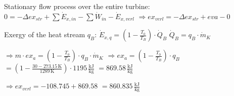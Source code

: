 Stationary flow process over the entire turbine:  
\( 0 = -\Delta ex_{str} + \sum \dot{E}_{x,in} - \sum \dot{W}_{in} - \dot{E}_{x,verl} \)  
\( \Rightarrow ex_{verl} = -\Delta ex_{str} + eva - 0 \)  

Exergy of the heat stream \( q_B \):  
\( \dot{E}_{x,q} = \left( 1 - \frac{T_0}{T_B} \right) \cdot \dot{Q}_B \)  
\( \dot{Q}_B = q_B \cdot \dot{m}_K \)  

\( \Rightarrow m \cdot ex_{a} = \left( 1 - \frac{T_0}{T_B} \right) \cdot q_B \cdot \dot{m}_K \)  
\( \Rightarrow ex_{a} = \left( 1 - \frac{T_0}{T_B} \right) \cdot q_B \)  
\( = \left( 1 - \frac{30 - 273.15 \, \text{K}}{1289 \, \text{K}} \right) \cdot 1195 \, \frac{\text{kJ}}{\text{kg}} \)  
\( = 869.58 \, \frac{\text{kJ}}{\text{kg}} \)  

\( \Rightarrow ex_{verl} = -108.745 + 869.58 \)  
\( = 860.835 \, \frac{\text{kJ}}{\text{kg}} \)